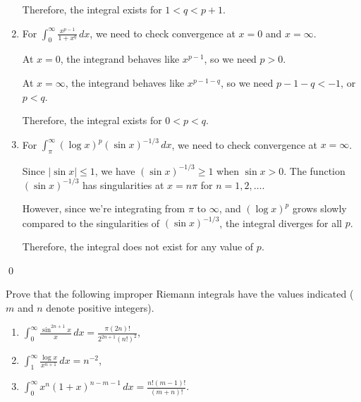 \begin{enumerate}[label=(\alph*)]
    Therefore, the integral exists for $1 < q < p + 1$.
    
    \item For $\int_{0}^{\infty} \frac{x^{p-1}}{1 + x^q} \, dx$, we need to check convergence at $x = 0$ and $x = \infty$.
    
    At $x = 0$, the integrand behaves like $x^{p-1}$, so we need $p > 0$.
    
    At $x = \infty$, the integrand behaves like $x^{p-1-q}$, so we need $p - 1 - q < -1$, or $p < q$.
    
    Therefore, the integral exists for $0 < p < q$.
    
    \item For $\int_{\pi}^{\infty} (\log x)^p (\sin x)^{-1/3} \, dx$, we need to check convergence at $x = \infty$.
    
    Since $|\sin x| \leq 1$, we have $(\sin x)^{-1/3} \geq 1$ when $\sin x > 0$. The function $(\sin x)^{-1/3}$ has singularities at $x = n\pi$ for $n = 1, 2, \ldots$.
    
    However, since we're integrating from $\pi$ to $\infty$, and $(\log x)^p$ grows slowly compared to the singularities of $(\sin x)^{-1/3}$, the integral diverges for all $p$.
    
    Therefore, the integral does not exist for any value of $p$.
\end{enumerate}\qed


\begin{problembox}
Prove that the following improper Riemann integrals have the values indicated ($m$ and $n$ denote positive integers).
\begin{enumerate}[label=(\alph*)]
    \item $\int_{0}^{\infty} \frac{\sin^{2n+1} x}{x} \, dx = \frac{\pi(2n)!}{2^{2n+1}(n!)^2}$,
    \item $\int_{1}^{\infty} \frac{\log x}{x^{n+1}} \, dx = n^{-2}$,
    \item $\int_{0}^{\infty} x^n (1 + x)^{n-m-1} \, dx = \frac{n!(m-1)!}{(m+n)!}$.
\end{enumerate}
\end{problembox}

